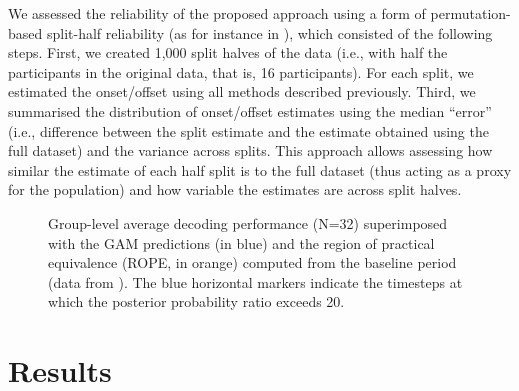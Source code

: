 \documentclass[
  doc,
  floatsintext,
  longtable,
  a4paper,
  nolmodern,
  notxfonts,
  notimes,
  donotrepeattitle,
  colorlinks=true,linkcolor=blue,citecolor=blue,urlcolor=blue]{apa7}
\begin{document}
We assessed the reliability of the proposed approach using a form of
permutation-based split-half reliability (as for instance in
), which consisted
of the following steps. First, we created 1,000 split halves of the data
(i.e., with half the participants in the original data, that is, 16
participants). For each split, we estimated the onset/offset using all
methods described previously. Third, we summarised the distribution of
onset/offset estimates using the median ``error'' (i.e., difference
between the split estimate and the estimate obtained using the full
dataset) and the variance across splits. This approach allows assessing
how similar the estimate of each half split is to the full dataset (thus
acting as a proxy for the population) and how variable the estimates are
across split halves.

\begin{figure}[!htb]

\caption{\label{fig-decoding-data}Group-level average decoding
performance (N=32) superimposed with the GAM predictions (in blue) and
the region of practical equivalence (ROPE, in orange) computed from the
baseline period (data from ). The blue horizontal markers indicate the
timesteps at which the posterior probability ratio exceeds 20.}


\end{figure}%

\newpage

\section{Results}\label{results}
\end{document}

